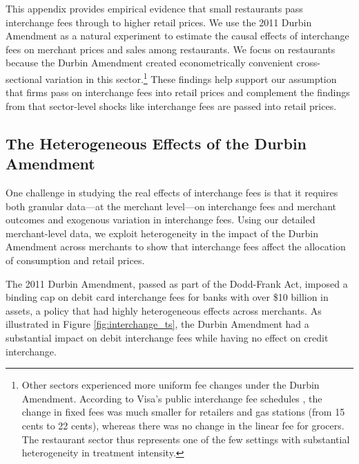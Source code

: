 \documentclass[11pt,english]{article}
\theoremstyle{remark}
\begin{document}
This appendix provides empirical evidence that small restaurants pass interchange fees through to higher retail prices.
We use the 2011 Durbin Amendment as a natural experiment to estimate the causal effects of interchange fees on merchant prices and sales among restaurants.
We focus on restaurants because the Durbin Amendment created econometrically convenient cross-sectional variation in this sector.\footnote{ Other sectors experienced more uniform fee changes under the Durbin Amendment.
According to Visa's public interchange fee schedules \citep{Visa2010}, the change in fixed fees was much smaller for retailers and gas stations (from 15 cents to 22 cents), whereas there was no change in the linear fee for grocers.
The restaurant sector thus represents one of the few settings with substantial heterogeneity in treatment intensity. } These findings help support our assumption that firms pass on interchange fees into retail prices and complement the findings from \citet{Amiti.etal2019} that sector-level shocks like interchange fees are passed into retail prices.

\subsection{The Heterogeneous Effects of the Durbin Amendment}

One challenge in studying the real effects of interchange fees is that it requires both granular data---at the merchant level---on interchange fees and merchant outcomes and exogenous variation in interchange fees.
Using our detailed merchant-level data, we exploit heterogeneity in the impact of the Durbin Amendment across merchants to show that interchange fees affect the allocation of consumption and retail prices.

The 2011 Durbin Amendment, passed as part of the Dodd-Frank Act, imposed a binding cap on debit card interchange fees for banks with over \$10 billion in assets, a policy that had highly heterogeneous effects across merchants.
As illustrated in Figure \ref{fig:interchange_ts}, the Durbin Amendment had a substantial impact on debit interchange fees while having no effect on credit interchange.
\end{document}

